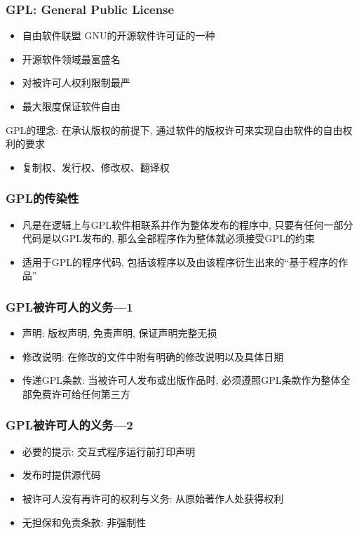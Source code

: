 \documentclass[compress]{beamer}
\begin{document}
\begin{frame}
\frametitle{GPL: General Public License}
\begin{itemize}
\item 自由软件联盟 GNU的开源软件许可证的一种
\item 开源软件领域最富盛名
\item 对被许可人权利限制最严
\item 最大限度保证软件自由
\end{itemize}

GPL的理念: 在承认版权的前提下, 通过软件的版权许可来实现自由软件的自由权利的要求
\begin{itemize}
\item 复制权、发行权、修改权、翻译权
\end{itemize}


\end{frame}

\begin{frame}
\frametitle{GPL的传染性}

\begin{itemize}
\item 凡是在逻辑上与GPL软件相联系并作为整体发布的程序中,
只要有任何一部分代码是以GPL发布的, 那么全部程序作为整体就必须接受GPL的约束
\item 适用于GPL的程序代码, 包括该程序以及由该程序衍生出来的``基于程序的作品''

\end{itemize}


\end{frame}

\begin{frame}
\frametitle{GPL被许可人的义务---1}
\begin{itemize}
\item 声明: 版权声明, 免责声明, 保证声明完整无损
\item 修改说明: 在修改的文件中附有明确的修改说明以及具体日期
\item 传递GPL条款: 当被许可人发布或出版作品时, 必须遵照GPL条款作为整体全部免费许可给任何第三方
\end{itemize}


\end{frame}

\begin{frame}
\frametitle{GPL被许可人的义务---2}
\begin{itemize}
\item 必要的提示: 交互式程序运行前打印声明
\item 发布时提供源代码
\item 被许可人没有再许可的权利与义务: 从原始著作人处获得权利
\item 无担保和免责条款: 非强制性
\end{itemize}


\end{frame}
\end{document}
